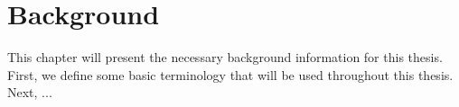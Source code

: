 \chapter{Background}
\label{ch:background}
This chapter will present the necessary background information for this thesis. First, we define some basic terminology that will be used throughout this thesis. Next, ...



